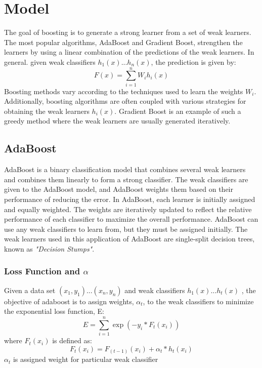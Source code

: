 \documentclass[10pt,twocolumn,letterpaper]{article}
\begin{document}
\section{Model}
\indent \indent The goal of boosting is to generate a strong learner from a set of weak learners. The most popular algorithms, AdaBoost and Gradient Boost, strengthen the learners by using a linear combination of the predictions of the weak learners. In general. given weak classifiers $h_1(x)...h_n(x)$, the prediction is given by:
\begin{equation}
F(x)=\sum_{i=1}^{n}W_ih_i(x)
\end{equation}
\indent Boosting methods vary according to the techniques used to learn the weights $W_i$. Additionally, boosting algorithms are often coupled with various strategies for obtaining the weak learners $h_i(x)$. Gradient Boost is an example of such a greedy method where the weak learners are usually generated iteratively.
\subsection{AdaBoost}
\indent  AdaBoost is a binary classification model that combines several weak learners and combines them linearly to form a strong classifier. The weak classifiers are given to the AdaBoost model, and AdaBoost weights them based on their performance of reducing the error. In AdaBoost, each learner is initially assigned and equally weighted. The weights are iteratively updated to reflect the relative performance of each classifier to maximize the overall performance. AdaBoost can use any weak classifiers to learn from, but they must be assigned initially.  The weak learners used in this application of AdaBoost are single-split decision trees, known as \textit{"Decision Stumps"}. 

\subsubsection{Loss Function and $\alpha$}
\indent  Given a data set ${(x_1,y_1)...(x_n,y_n)}$ and weak classifiers $h_1(x)...h_t(x)$ , the objective of adaboost is to assign weights, $\alpha_t$, to the weak classifiers to minimize the exponential loss function, E:
\begin{equation}
E = \sum_{i=1}^{n}\exp(-y_i*F_t(x_i))
\end{equation}
where $F_t(x_i)$ is defined as:
\begin{equation}
F_t(x_i) = F_{(t-1)}(x_i)+\alpha_t*h_t(x_i)
\end{equation}
$\alpha_t$ is assigned weight for particular weak classifier
\cite{adaorig}
\end{document}
